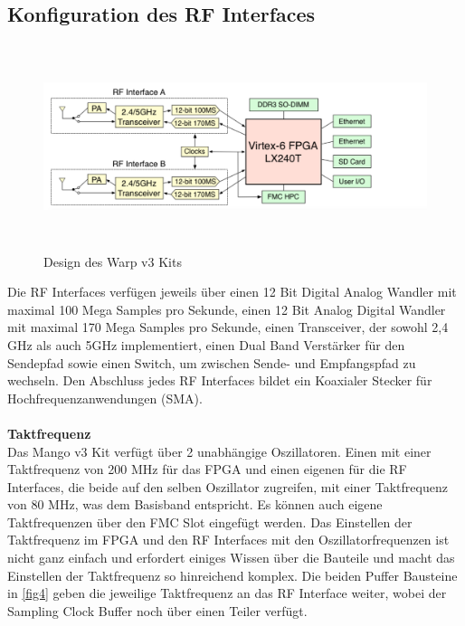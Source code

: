 \documentclass[letterpaper,11pt,ngerman]{article}
\begin{document}
\begin{onehalfspace}
\subsection{Konfiguration des RF Interfaces}
\label{ssc:RF}
\begin{figure}[H]
\begin{center}
\includegraphics[width = 16cm,height=6cm]{RF-inteface.png}
\caption{Design des Warp v3 Kits  \cite{[3]}}
\label{fig3}
\end{center}
\end{figure}
\noindent Die RF Interfaces verfügen jeweils über einen 12 Bit Digital Analog Wandler mit maximal 100 Mega Samples pro Sekunde, einen 12 Bit Analog Digital Wandler mit maximal 170 Mega Samples pro Sekunde, einen Transceiver, der sowohl 2,4 GHz als auch 5GHz implementiert, einen Dual Band Verstärker für den Sendepfad sowie einen Switch, um zwischen Sende- und Empfangspfad zu wechseln. Den Abschluss jedes RF Interfaces bildet ein Koaxialer Stecker für Hochfrequenzanwendungen (SMA).\\
\\
\noindent \textbf{Taktfrequenz}\\
Das Mango v3 Kit verfügt über 2 unabhängige  Oszillatoren. Einen mit einer Taktfrequenz von 200 MHz für das FPGA und einen eigenen für die RF Interfaces, die beide auf den selben Oszillator zugreifen, mit einer Taktfrequenz von 80 MHz, was dem Basisband entspricht. Es können auch eigene Taktfrequenzen über den FMC Slot eingefügt werden. Das Einstellen der Taktfrequenz im FPGA und den RF Interfaces mit den Oszillatorfrequenzen ist nicht ganz einfach und erfordert einiges Wissen über die Bauteile und macht das Einstellen der Taktfrequenz so hinreichend komplex. Die beiden Puffer Bausteine in \autoref{fig4} geben die jeweilige Taktfrequenz an das RF Interface weiter, wobei der Sampling Clock Buffer noch über einen Teiler verfügt.
\begin{figure}[H]
\begin{center}

\end{center}
\end{figure}
\end{onehalfspace}
\end{document}
